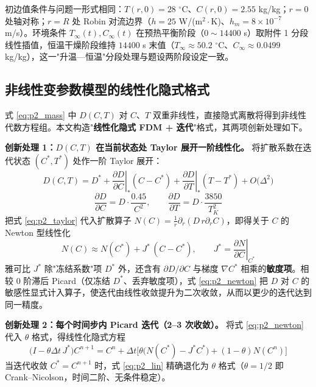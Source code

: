\documentclass[12pt,a4paper]{ctexart}
\begin{document}
初边值条件与问题一形式相同：$T(r,0)=28$ $^\circ$C、$C(r,0)=2.55$ kg/kg；$r=0$ 处轴对称；$r=R$ 处 Robin 对流边界（$h=25$ W/(m$^2\cdot$K)、$h_m=8\times10^{-7}$ m/s）。环境条件 $T_\infty(t),C_\infty(t)$ 在预热平衡阶段（$0\sim14400$ s）取附件 1 分段线性插值，恒温干燥阶段维持 $14400$ s 末值（$T_\infty\approx50.2$ $^\circ$C、$C_\infty\approx0.0499$ kg/kg），这一"升温—恒温"分段处理与题设两阶段设定一致。

\subsection{非线性变参数模型的线性化隐式格式}

式 \eqref{eq:p2_mass} 中 $D(C,T)$ 对 $C$、$T$ 双重非线性，直接隐式离散将得到非线性代数方程组。本文构造"\textbf{线性化隐式 FDM + 迭代}"格式，其两项创新处理如下。

\textbf{创新处理 1：$D(C,T)$ 在当前状态处 Taylor 展开一阶线性化。}
将扩散系数在迭代状态 $(C^*,T^*)$ 处作一阶 Taylor 展开：
\begin{equation}
D(C,T)=D^*+\left.\frac{\partial D}{\partial C}\right|_*(C-C^*)+\left.\frac{\partial D}{\partial T}\right|_*(T-T^*)+O\big(\Delta^2\big)
\label{eq:p2_taylor}
\end{equation}
\begin{equation}
\frac{\partial D}{\partial C}=D\cdot\frac{0.45}{C^2},\qquad
\frac{\partial D}{\partial T}=D\cdot\frac{3850}{T_K^2}
\label{eq:p2_dD}
\end{equation}
把式 \eqref{eq:p2_taylor} 代入扩散算子 $N(C)=\tfrac1r\partial_r(D\,r\partial_rC)$，即得关于 $C$ 的 Newton 型线性化
\begin{equation}
N(C)\approx N(C^*)+J^*\,(C-C^*),\qquad J^*=\left.\frac{\partial N}{\partial C}\right|_{C^*}
\label{eq:p2_newton}
\end{equation}
雅可比 $J^*$ 除"冻结系数"项 $D^*$ 外，还含有 $\partial D/\partial C$ 与梯度 $\nabla C^*$ 相乘的\textbf{敏度项}。相较 $0$ 阶滞后 Picard（仅冻结 $D^*$、丢弃敏度项），式 \eqref{eq:p2_newton} 把 $D$ 对 $C$ 的敏感性显式计入算子，使迭代由线性收敛提升为二次收敛，从而以更少的迭代达到同一精度。

\textbf{创新处理 2：每个时间步内 Picard 迭代（2--3 次收敛）。}
将式 \eqref{eq:p2_newton} 代入 $\theta$ 格式，得线性化隐式方程
\begin{equation}
\big(I-\theta\Delta t\,J^*\big)C^{n+1}=C^{n}+\Delta t\Big[\theta\big(N(C^*)-J^*C^*\big)+(1-\theta)N(C^n)\Big]
\label{eq:p2_lin}
\end{equation}
当迭代收敛 $C^*=C^{n+1}$ 时，式 \eqref{eq:p2_lin} 精确退化为 $\theta$ 格式（$\theta=1/2$ 即 Crank--Nicolson，时间二阶、无条件稳定）。
\end{document}
